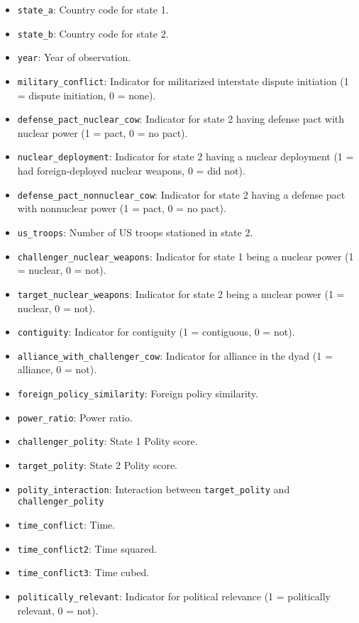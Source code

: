 \documentclass[12pt]{article}
\begin{document}
\begin{itemize}
  \item \texttt{state\_a}: Country code for state 1.
  \item \texttt{state\_b}: Country code for state 2.
  \item \texttt{year}: Year of observation.
  \item \texttt{military\_conflict}: Indicator for militarized interstate dispute initiation (1 = dispute initiation, 0 = none).
  \item \texttt{defense\_pact\_nuclear\_cow}: Indicator for state 2 having defense pact with nuclear power (1 = pact, 0 = no pact).
  \item \texttt{nuclear\_deployment}: Indicator for state 2 having a  nuclear deployment (1 = had foreign-deployed nuclear weapons, 0 = did not).
  \item \texttt{defense\_pact\_nonnuclear\_cow}: Indicator for state 2 having a defense pact with nonnuclear power (1 = pact, 0 = no pact).
  \item \texttt{us\_troops}: Number of US troops stationed in state 2.
  \item \texttt{challenger\_nuclear\_weapons}: Indicator for state 1 being a nuclear power (1 = nuclear, 0 = not).
  \item \texttt{target\_nuclear\_weapons}: Indicator for state 2 being a nuclear power (1 = nuclear, 0 = not).
  \item \texttt{contiguity}: Indicator for contiguity (1 = contiguous, 0 = not).
  \item \texttt{alliance\_with\_challenger\_cow}: Indicator for alliance in the dyad (1 = alliance, 0 = not).
  \item \texttt{foreign\_policy\_similarity}: Foreign policy similarity.
  \item \texttt{power\_ratio}: Power ratio.
  \item \texttt{challenger\_polity}: State 1 Polity score.
  \item \texttt{target\_polity}: State 2 Polity score.
  \item \texttt{polity\_interaction}: Interaction between \texttt{target\_polity} and \texttt{challenger\_polity}
  \item \texttt{time\_conflict}: Time.
  \item \texttt{time\_conflict2}: Time squared.
  \item \texttt{time\_conflict3}: Time cubed.
  \item \texttt{politically\_relevant}: Indicator for political relevance (1 = politically relevant, 0 = not).
\end{itemize}
\end{document}
